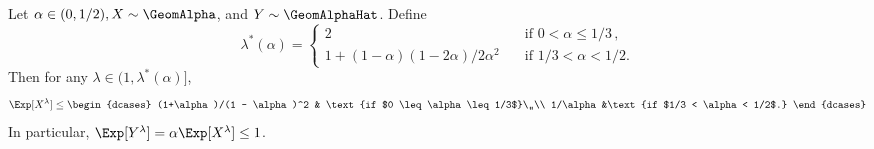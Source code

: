 \begin{proposition}\label{prop:li-convergence}
    Let $\alpha \in (0, 1/2), X \sim \GeomAlpha$, and $Y \sim \GeomAlphaHat$. 
    Define 
    \begin{equation}\label{eq:lambda-star}
        \lambda^*(\alpha) = \begin{cases}
            2 & \quad\text{if $0 < \alpha \leq 1/3$}\,,\\
            1 + (1- \alpha)(1 - 2 \alpha)/2 \alpha^2&\quad\text{if $1/3 < \alpha < 1/2$.}
        \end{cases}
    \end{equation}
    Then for any $\lambda \in (1, \lambda^*(\alpha)]$, 
    \begin{equation}\label{eq:geom-moment-converge}
        \Exp[X^\lambda] \leq \begin{dcases}
            (1+\alpha)/(1 - \alpha)^2 & \text{if $0 \leq \alpha \leq 1/3$}\,,\\
            1/\alpha&\text{if $1/3 < \alpha < 1/2$.}
        \end{dcases}
    \end{equation}
    In particular, $\Exp[Y^\lambda] = \alpha \Exp[X^{\lambda}] \leq 1$.
\end{proposition}
